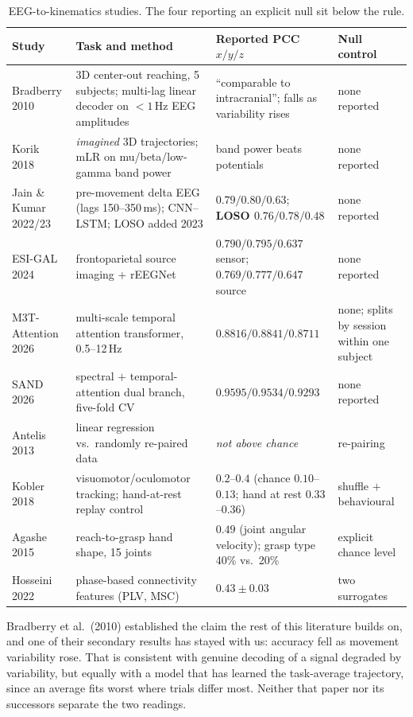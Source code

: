 \documentclass[11pt]{article}
\begin{document}
\begin{table}[H]
\centering\scriptsize
\setlength{\tabcolsep}{4pt}
\begin{tabular}{@{}L{2.1cm}L{6.0cm}L{3.6cm}L{3.1cm}@{}}
\toprule
Study & Task and method & Reported PCC $x/y/z$ & Null control \\
\midrule
Bradberry 2010 & 3D center-out reaching, 5 subjects; multi-lag linear decoder on ${<}1$\,Hz EEG amplitudes & ``comparable to intracranial''; falls as variability rises & none reported \\
Korik 2018 & \emph{imagined} 3D trajectories; mLR on mu/beta/low-gamma band power & band power beats potentials & none reported \\
Jain \& Kumar 2022/23 & pre-movement delta EEG (lags 150--350\,ms); CNN--LSTM; LOSO added 2023 & $0.79/0.80/0.63$; \textbf{LOSO $0.76/0.78/0.48$} & none reported \\
ESI-GAL 2024 & frontoparietal source imaging $+$ rEEGNet & $0.790/0.795/0.637$ sensor; $0.769/0.777/0.647$ source & none reported \\
M3T-Attention 2026 & multi-scale temporal attention transformer, 0.5--12\,Hz & $0.8816/0.8841/0.8711$ & none; splits by session within one subject \\
SAND 2026 & spectral $+$ temporal-attention dual branch, five-fold CV & $0.9595/0.9534/0.9293$ & none reported \\
\midrule
Antelis 2013 & linear regression vs.\ randomly re-paired data & \emph{not above chance} & re-pairing \\
Kobler 2018 & visuomotor/oculomotor tracking; hand-at-rest replay control & $0.2$--$0.4$ (chance $0.10$--$0.13$; hand at rest $0.33$--$0.36$) & shuffle $+$ behavioural \\
Agashe 2015 & reach-to-grasp hand shape, 15 joints & $0.49$ (joint angular velocity); grasp type 40\% vs.\ 20\% & explicit chance level \\
Hosseini 2022 & phase-based connectivity features (PLV, MSC) & $0.43\pm0.03$ & two surrogates \\
\bottomrule
\end{tabular}
\caption{EEG-to-kinematics studies. The four reporting an explicit null sit below the rule.}
\label{tab:lit}
\end{table}

\vspace{-1.3em}
Bradberry et al.~(2010) established the claim the rest of this literature builds on, and one of their secondary results has stayed with us: accuracy fell as movement variability rose. That is consistent with genuine decoding of a signal degraded by variability, but equally with a model that has learned the task-average trajectory, since an average fits worst where trials differ most. Neither that paper nor its successors separate the two readings.
\end{document}
